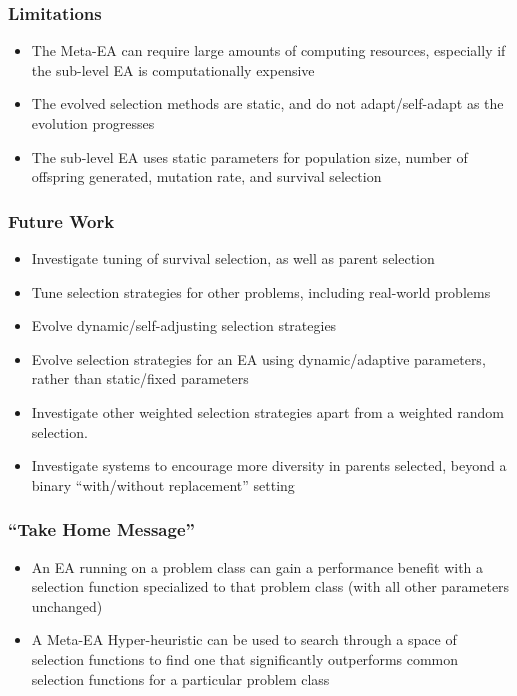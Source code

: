 \documentclass{beamer}
\begin{document}
	\begin{frame}
		\frametitle{Limitations}
			\begin{itemize}
			\item<1-|alert@1> The Meta-EA can require large amounts of computing resources, especially if the sub-level EA is computationally expensive
			\item<2-|alert@2> The evolved selection methods are static, and do not adapt/self-adapt as the evolution progresses
			\item<3-|alert@3> The sub-level EA uses static parameters for population size, number of offspring generated, mutation rate, and survival selection
			\end{itemize}
	\end{frame}
	
	\begin{frame}
		\frametitle{Future Work}
		\begin{itemize}
			\item<1-|alert@1> Investigate tuning of survival selection, as well as parent selection
			\item<2-|alert@2> Tune selection strategies for other problems, including real-world problems
			\item<3-|alert@3> Evolve dynamic/self-adjusting selection strategies
			\item<4-|alert@4> Evolve selection strategies for an EA using dynamic/adaptive parameters, rather than static/fixed parameters
			\item<5-|alert@5> Investigate other weighted selection strategies apart from a weighted random selection.
			\item<6-|alert@6> Investigate systems to encourage more diversity in parents selected, beyond a binary ``with/without replacement'' setting
		\end{itemize}
	\end{frame}
	
	\begin{frame}
		\frametitle{``Take Home Message''}
			\begin{itemize}
				\item<1-|alert@1> An EA running on a problem class can gain a performance benefit with a selection function specialized to that problem class (with all other parameters unchanged)
				\item<2-|alert@2> A Meta-EA Hyper-heuristic can be used to search through a space of selection functions to find one that significantly outperforms common selection  functions for a particular problem class
			\end{itemize}
	\end{frame}


 
\end{document}
